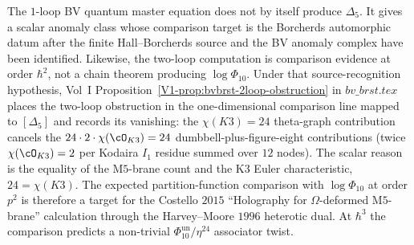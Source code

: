 \begin{remark}
\label{rem:htpo-two-loop}
The $1$-loop BV quantum master equation does not by itself produce
$\Delta_5$. It gives a scalar anomaly class whose comparison target is
the Borcherds automorphic datum after the finite Hall--Borcherds source
and the BV anomaly complex have been identified. Likewise, the
two-loop computation is comparison evidence at order $\hbar^2$, not a
chain theorem producing $\log\Phi_{10}$. Under that source-recognition
hypothesis, Vol~I Proposition~\ref{V1-prop:bvbrst-2loop-obstruction} in
$bv\_brst.tex$ places the two-loop obstruction in the one-dimensional
comparison line mapped to $[\Delta_5]$ and records its vanishing: the
$\chi(K3) = 24$ theta-graph contribution cancels the
$24\cdot 2\cdot\chi(\cO_{K3}) = 24$ dumbbell-plus-figure-eight
contributions (twice $\chi(\cO_{K3}) = 2$ per Kodaira $I_1$ residue
summed over $12$ nodes). The scalar reason is the equality of the
M$5$-brane count and the K3 Euler characteristic,
$24=\chi(K3)$. The expected partition-function comparison with
$\log\Phi_{10}$ at order $p^2$ is therefore a target for the
Costello $2015$ ``Holography for $\Omega$-deformed M$5$-brane''
\cite{Costello2015omega} calculation through the Harvey--Moore $1996$
heterotic dual. At $\hbar^3$ the comparison predicts a non-trivial
$\Phi_{10}^{\mathrm{un}}/\eta^{24}$ associator twist.
\end{remark}
